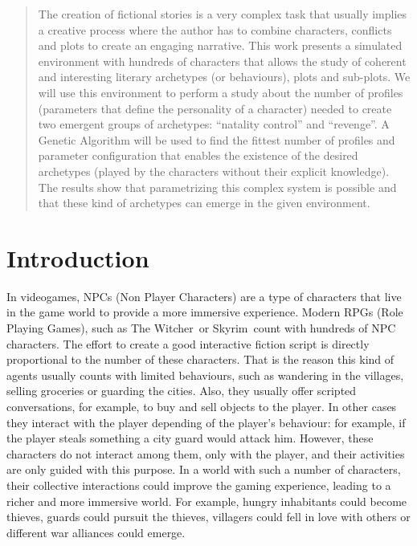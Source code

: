 \documentclass[runningheads]{llncs}
\begin{document}
\begin{abstract}


The creation of fictional stories is a very complex task that usually
implies a creative process where the author has to combine characters,
conflicts and plots to create an engaging narrative. This work
presents a simulated environment with hundreds of characters that
allows the study of coherent and interesting literary archetypes (or
behaviours), plots and sub-plots. We will use this environment to
perform a study about the number of profiles (parameters that define
the personality of a character) needed to create two emergent groups
of archetypes: ``natality control'' and ``revenge''. A Genetic Algorithm
will be used to find the fittest number of profiles and parameter
configuration that enables the existence of the desired archetypes
(played by the characters without their explicit knowledge). The
results show that parametrizing this complex system is possible and
that these kind of archetypes can emerge in the given environment. 

\end{abstract}




\section{Introduction}
\noindent 

In videogames, NPCs (Non Player Characters)  are a type of characters that live in the game world to provide a more immersive experience. Modern RPGs (Role Playing Games), such as The Witcher\texttrademark~or Skyrim\texttrademark~count with hundreds of NPC characters. The effort to create a good interactive fiction script is directly proportional to the number of these characters. That is the reason this kind of agents usually counts with limited behaviours, such as wandering in the villages, selling groceries or guarding the cities. Also, they usually offer scripted conversations, for example, to buy and sell objects to the player. In other cases they interact with the player depending of the player's behaviour: for example, if the player steals something a city guard would attack him.  However, these characters do not interact among them, only with the player, and their activities are only guided with this purpose. In a world with such a number of characters, their collective interactions could improve the gaming experience, leading to a richer and more immersive world. For example, hungry inhabitants could become thieves, guards could pursuit the thieves, villagers could fell in love with others or different war alliances could emerge.
\end{document}
